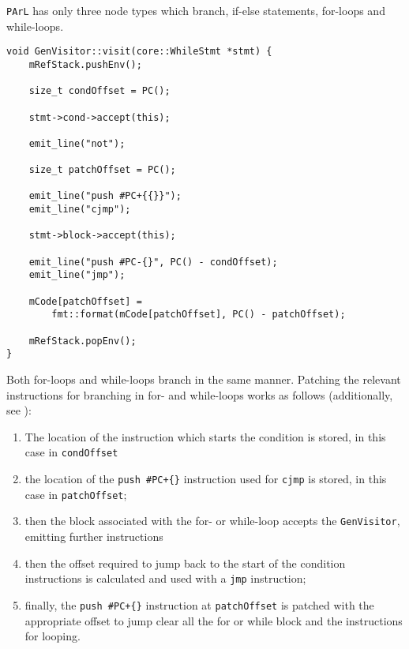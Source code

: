 \texttt{PArL} has only three node types which branch, if-else
statements, for-loops and while-loops.

\begin{lstlisting}[caption={The \texttt{visit(WhileStmt *)}
method in the \texttt{GenVisitor} class
(ir\_gen/GenVisitor.cpp)}, label=lst:whilestmtgen]
void GenVisitor::visit(core::WhileStmt *stmt) {
    mRefStack.pushEnv();

    size_t condOffset = PC();

    stmt->cond->accept(this);

    emit_line("not");

    size_t patchOffset = PC();

    emit_line("push #PC+{{}}");
    emit_line("cjmp");

    stmt->block->accept(this);

    emit_line("push #PC-{}", PC() - condOffset);
    emit_line("jmp");

    mCode[patchOffset] =
        fmt::format(mCode[patchOffset], PC() - patchOffset);

    mRefStack.popEnv();
}
\end{lstlisting}

Both for-loops and while-loops branch in the same manner.
Patching the relevant instructions for branching in for- and
while-loops works as follows (additionally, see
):

\begin{enumerate}
    \item The location of the instruction which starts the
        condition is stored, in this case in
        \texttt{condOffset}
    \item the location of the \texttt{push \#PC+\{\}}
        instruction used for \texttt{cjmp} is stored, in this
        case in \texttt{patchOffset};
    \item then the block associated with the for- or while-loop
        accepts the \texttt{GenVisitor}, emitting further
        instructions
    \item then the offset required to jump back to the
        start of the condition instructions is calculated and
        used with a \texttt{jmp} instruction;
    \item finally, the \texttt{push \#PC+\{\}} instruction at
        \texttt{patchOffset} is patched with the appropriate
        offset to jump clear all the for or while block and the
        instructions for looping.
\end{enumerate}

